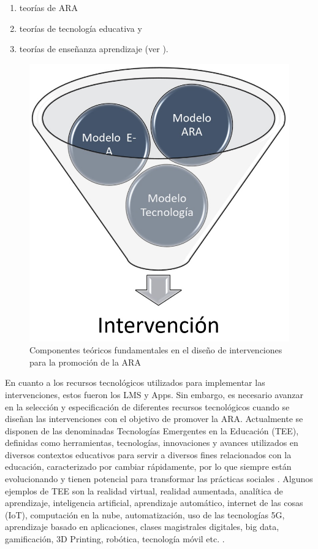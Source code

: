 \documentclass[spanish]{textolivre}
\begin{document}
\begin{enumerate}
    \item teorías de ARA
    \item teorías de tecnología educativa y
    \item teorías de enseñanza aprendizaje (ver ). 
\end{enumerate}

\begin{figure}[htbp]
\centering
\begin{minipage}{.5\textwidth}
 \includegraphics[width=\textwidth]{Fig3.jpeg}
 \caption{Componentes teóricos fundamentales en el diseño de intervenciones para la promoción de la ARA}
 \label{fig3}
\end{minipage}
\end{figure}

En cuanto a los recursos tecnológicos utilizados para implementar las intervenciones, estos fueron los LMS y Apps. Sin embargo, es necesario avanzar en la selección y especificación de diferentes recursos tecnológicos cuando se diseñan las intervenciones con el objetivo de promover la ARA. Actualmente se disponen de las denominadas Tecnologías Emergentes en la Educación (TEE), definidas como herramientas, tecnologías, innovaciones y avances utilizados en diversos contextos educativos para servir a diversos fines relacionados con la educación, caracterizado por cambiar rápidamente, por lo que siempre están evolucionando y tienen potencial para transformar las prácticas sociales \cite{neira2017emerging}. Algunos ejemplos de TEE son la realidad virtual, realidad aumentada, analítica de aprendizaje, inteligencia artificial, aprendizaje automático, internet de las cosas (IoT), computación en la nube, automatización, uso de las tecnologías 5G, aprendizaje basado en aplicaciones, clases magistrales digitales, big data, gamificación, 3D Printing, robótica, tecnología móvil etc. \cite{oliveira2019emerging}. 
\end{document}
